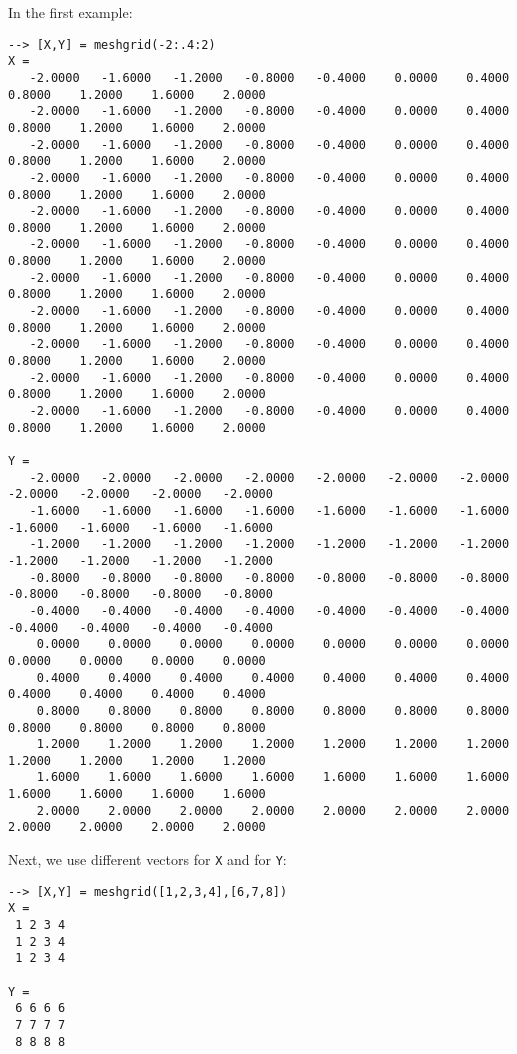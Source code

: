 In the first example:
\begin{verbatim}
--> [X,Y] = meshgrid(-2:.4:2)
X = 
   -2.0000   -1.6000   -1.2000   -0.8000   -0.4000    0.0000    0.4000    0.8000    1.2000    1.6000    2.0000 
   -2.0000   -1.6000   -1.2000   -0.8000   -0.4000    0.0000    0.4000    0.8000    1.2000    1.6000    2.0000 
   -2.0000   -1.6000   -1.2000   -0.8000   -0.4000    0.0000    0.4000    0.8000    1.2000    1.6000    2.0000 
   -2.0000   -1.6000   -1.2000   -0.8000   -0.4000    0.0000    0.4000    0.8000    1.2000    1.6000    2.0000 
   -2.0000   -1.6000   -1.2000   -0.8000   -0.4000    0.0000    0.4000    0.8000    1.2000    1.6000    2.0000 
   -2.0000   -1.6000   -1.2000   -0.8000   -0.4000    0.0000    0.4000    0.8000    1.2000    1.6000    2.0000 
   -2.0000   -1.6000   -1.2000   -0.8000   -0.4000    0.0000    0.4000    0.8000    1.2000    1.6000    2.0000 
   -2.0000   -1.6000   -1.2000   -0.8000   -0.4000    0.0000    0.4000    0.8000    1.2000    1.6000    2.0000 
   -2.0000   -1.6000   -1.2000   -0.8000   -0.4000    0.0000    0.4000    0.8000    1.2000    1.6000    2.0000 
   -2.0000   -1.6000   -1.2000   -0.8000   -0.4000    0.0000    0.4000    0.8000    1.2000    1.6000    2.0000 
   -2.0000   -1.6000   -1.2000   -0.8000   -0.4000    0.0000    0.4000    0.8000    1.2000    1.6000    2.0000 

Y = 
   -2.0000   -2.0000   -2.0000   -2.0000   -2.0000   -2.0000   -2.0000   -2.0000   -2.0000   -2.0000   -2.0000 
   -1.6000   -1.6000   -1.6000   -1.6000   -1.6000   -1.6000   -1.6000   -1.6000   -1.6000   -1.6000   -1.6000 
   -1.2000   -1.2000   -1.2000   -1.2000   -1.2000   -1.2000   -1.2000   -1.2000   -1.2000   -1.2000   -1.2000 
   -0.8000   -0.8000   -0.8000   -0.8000   -0.8000   -0.8000   -0.8000   -0.8000   -0.8000   -0.8000   -0.8000 
   -0.4000   -0.4000   -0.4000   -0.4000   -0.4000   -0.4000   -0.4000   -0.4000   -0.4000   -0.4000   -0.4000 
    0.0000    0.0000    0.0000    0.0000    0.0000    0.0000    0.0000    0.0000    0.0000    0.0000    0.0000 
    0.4000    0.4000    0.4000    0.4000    0.4000    0.4000    0.4000    0.4000    0.4000    0.4000    0.4000 
    0.8000    0.8000    0.8000    0.8000    0.8000    0.8000    0.8000    0.8000    0.8000    0.8000    0.8000 
    1.2000    1.2000    1.2000    1.2000    1.2000    1.2000    1.2000    1.2000    1.2000    1.2000    1.2000 
    1.6000    1.6000    1.6000    1.6000    1.6000    1.6000    1.6000    1.6000    1.6000    1.6000    1.6000 
    2.0000    2.0000    2.0000    2.0000    2.0000    2.0000    2.0000    2.0000    2.0000    2.0000    2.0000 
\end{verbatim}
Next, we use different vectors for \verb|X| and for \verb|Y|:
\begin{verbatim}
--> [X,Y] = meshgrid([1,2,3,4],[6,7,8])
X = 
 1 2 3 4 
 1 2 3 4 
 1 2 3 4 

Y = 
 6 6 6 6 
 7 7 7 7 
 8 8 8 8 
\end{verbatim}
